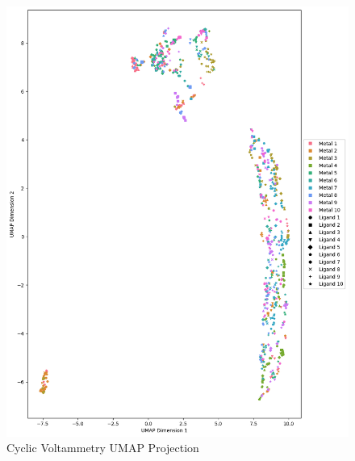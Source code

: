 \begin{figure}[h!]
  \centering
    \includegraphics[width=1.0\textwidth]{figures/cv_umap.png}
    \caption{Cyclic Voltammetry UMAP Projection}
    \label{cv-umap}
\end{figure}
